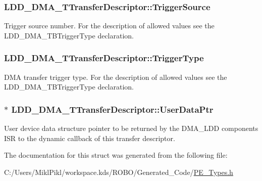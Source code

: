 \subsubsection[{Trigger\+Source}]{ L\+D\+D\+\_\+\+D\+M\+A\+\_\+\+T\+Transfer\+Descriptor\+::\+Trigger\+Source}\label{struct_l_d_d___d_m_a___t_transfer_descriptor_a770d0bde209b081eafe87892ed333084}
Trigger source number. For the description of allowed values see the L\+D\+D\+\_\+\+D\+M\+A\+\_\+\+T\+B\+Trigger\+Type declaration. \hypertarget{struct_l_d_d___d_m_a___t_transfer_descriptor_a1d1ff275b5c883b0cad1b20ef1929716}{}
\subsubsection[{Trigger\+Type}]{ L\+D\+D\+\_\+\+D\+M\+A\+\_\+\+T\+Transfer\+Descriptor\+::\+Trigger\+Type}\label{struct_l_d_d___d_m_a___t_transfer_descriptor_a1d1ff275b5c883b0cad1b20ef1929716}
D\+M\+A transfer trigger type. For the description of allowed values see the L\+D\+D\+\_\+\+D\+M\+A\+\_\+\+T\+B\+Trigger\+Type declaration. \hypertarget{struct_l_d_d___d_m_a___t_transfer_descriptor_a4136d6742944c7b04a94695c78b581b8}{}
\subsubsection[{User\+Data\+Ptr}]{$\ast$ L\+D\+D\+\_\+\+D\+M\+A\+\_\+\+T\+Transfer\+Descriptor\+::\+User\+Data\+Ptr}\label{struct_l_d_d___d_m_a___t_transfer_descriptor_a4136d6742944c7b04a94695c78b581b8}
User device data structure pointer to be returned by the D\+M\+A\+\_\+\+L\+D\+D component\textquotesingle{}s I\+S\+R to the dynamic callback of this transfer descriptor. 

The documentation for this struct was generated from the following file\+:\begin{DoxyCompactItemize}
\item 
C\+:/\+Users/\+Mikl\+Pikl/workspace.\+kds/\+R\+O\+B\+O/\+Generated\+\_\+\+Code/\hyperlink{_p_e___types_8h}{P\+E\+\_\+\+Types.\+h}\end{DoxyCompactItemize}

